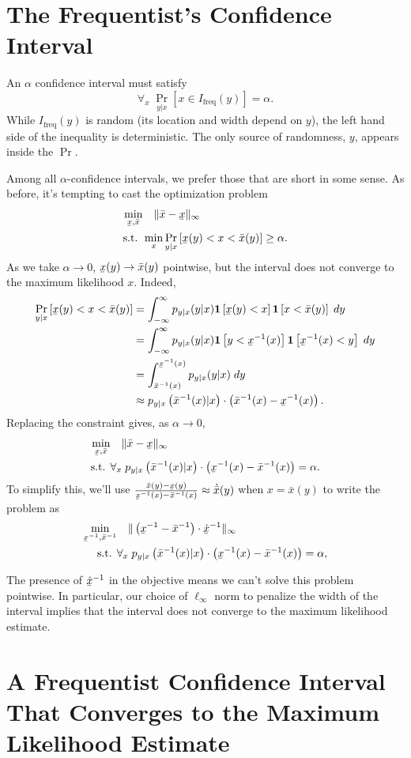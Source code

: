 \documentclass{article}
\newcommand{\Ifreq}{I_\text{freq}}
\newcommand{\xl}{\underaccent{\bar}{x}}
\newcommand{\xh}{\bar{x}}
\newcommand{\1}{\mathbf{1}}
\begin{document}
\section{The Frequentist's Confidence Interval}

An $\alpha$ confidence interval must satisfy
\begin{equation}
\forall_x\; \Pr_{y|x}\left[x \in \Ifreq(y)\right] = \alpha.
\end{equation}
While $\Ifreq(y)$ is random (its location and width depend on $y$), the left
hand side of the inequality is deterministic. The only source of randomness,
$y$, appears inside the $\Pr$. 

Among all $\alpha$-confidence intervals, we prefer those that are short in some
sense. As before, it's tempting to cast the optimization problem
\begin{align}\label{eq:freq-interval}
\min_{\xl, \xh} &\quad  \| \xh - \xl \|_\infty \\
\text{s.t. } & \min_x \Pr_{y|x}\left[\xl(y) < x < \xh(y) \right] \geq \alpha.
\end{align}
As we take $\alpha\to 0$, $\xl(y) \to \xh(y)$ pointwise, but the interval does not converge to the maximum likelihood $x$. Indeed,
\begin{align}
        \Pr_{y|x}\left[\xl(y) < x < \xh(y)\right] &= \int_{-\infty}^\infty p_{y|x}(y|x) \1\left[ \xl(y) < x\right] \1\left[x < \xh(y)\right] \;dy\\
        &= \int_{-\infty}^\infty p_{y|x}(y|x) \1\left[ y < \xl^{-1}(x)\right] \1\left[\xl^{-1}(x) < y\right] \;dy\\
        &= \int_{\xh^{-1}(x)}^{\xl^{-1}(x)} p_{y|x}(y|x)  \;dy\\
        &\approx p_{y|x}\left(\xh^{-1}(x) | x\right) \cdot \left(\xh^{-1}(x)-\xl^{-1}(x)\right).
\end{align}
Replacing the constraint gives, as $\alpha\to 0$,
\begin{align}
\min_{\xl, \xh} &\quad  \| \xh - \xl \|_\infty \\
\text{s.t. } & \forall_x\; p_{y|x}\left(\xh^{-1}(x) | x\right) \cdot \left(\xl^{-1}(x)-\xh^{-1}(x)\right) = \alpha.
\end{align}
To simplify this, we'll use $\frac{\xh(y) - \xl(y)}{\xl^{-1}(x)-\xh^{-1}(x)} \approx \dot{\xh}(y)$ when $x = \xh(y)$ to write the problem as
\begin{align}
        \min_{\xl^{-1}, \xh^{-1}} &\quad  \| \left(\xl^{-1} - \xh^{-1} \right) \cdot \dot{\xl}^{-1}\|_\infty \\
\text{s.t. } & \forall_x\; p_{y|x}\left(\xh^{-1}(x) | x\right) \cdot \left(\xl^{-1}(x)-\xh^{-1}(x)\right) = \alpha,
\end{align}

The presence of $\dot{\xl}^{-1}$ in the objective means we can't solve this
problem pointwise. In particular, our choice of $\ell_\infty$ norm to penalize
the width of the interval implies that the interval does not converge to the
maximum likelihood estimate.

\section{A Frequentist Confidence Interval That Converges to the Maximum Likelihood Estimate}
\end{document}

